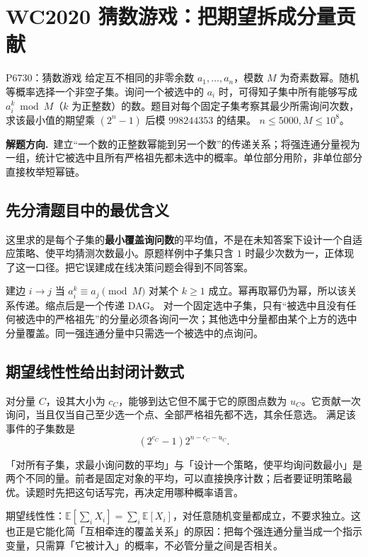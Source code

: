 \documentclass[UTF8,a4paper,11pt,twoside,openright,fontset=fandol]{ctexbook}
\theoremstyle{definition}
\newcommand{\hint}{\par\noindent\textbf{解题方向.}\ }
\begin{document}
\section{WC2020 猜数游戏：把期望拆成分量贡献}
\begin{problem}{P6730：猜数游戏}
给定互不相同的非零余数 $a_1,\ldots,a_n$，模数 $M$ 为奇素数幂。随机等概率选择一个非空子集。询问一个被选中的 $a_i$ 时，可得知子集中所有能够写成 $a_i^k\bmod M$（$k$ 为正整数）的数。题目对每个固定子集考察其最少所需询问次数，求该最小值的期望乘 $(2^n-1)$ 后模 $998244353$ 的结果。
$n\le5000,M\le10^8$。
\end{problem}
\hint 建立“一个数的正整数幂能到另一个数”的传递关系；将强连通分量视为一组，统计它被选中且所有严格祖先都未选中的概率。单位部分用阶，非单位部分直接枚举短幂链。

\subsection{先分清题目中的最优含义}
这里求的是每个子集的\textbf{最小覆盖询问数}的平均值，不是在未知答案下设计一个自适应策略、使平均猜测次数最小。原题样例中子集只含 $1$ 时最少次数为一，正体现了这一口径。把它误建成在线决策问题会得到不同答案。

建边 $i\to j$ 当 $a_i^k\equiv a_j\pmod M$ 对某个 $k\ge1$ 成立。幂再取幂仍为幂，所以该关系传递。缩点后是一个传递 DAG。
对一个固定选中子集，只有“被选中且没有任何被选中的严格祖先”的分量必须各询问一次；其他选中分量都由某个上方的选中分量覆盖。同一强连通分量中只需选一个被选中的点询问。

\subsection{期望线性性给出封闭计数式}
对分量 $C$，设其大小为 $c_C$，能够到达它但不属于它的原图点数为 $u_C$。它贡献一次询问，当且仅当自己至少选一个点、全部严格祖先都不选，其余任意选。
满足该事件的子集数是
\[
 (2^{c_C}-1)2^{n-c_C-u_C}.
\]

\begin{tip}
「对所有子集，求最小询问数的平均」与「设计一个策略，使平均询问数最小」是两个不同的量。前者是固定对象的平均，可以直接换序计数；后者要证明策略最优。读题时先把这句话写完，再决定用哪种概率语言。
\end{tip}

\begin{tip}[为什么不需要「独立」]
期望线性性：$\mathbb E[\sum_iX_i]=\sum_i\mathbb E[X_i]$，对任意随机变量都成立，不要求独立。这也正是它能化简「互相牵连的覆盖关系」的原因：把每个强连通分量当成一个指示变量，只需算「它被计入」的概率，不必管分量之间是否相关。
\end{tip}
\end{document}
